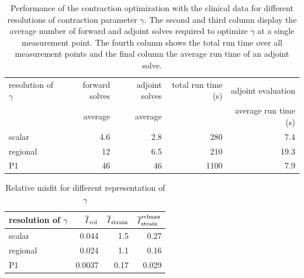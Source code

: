 \begin{table}
  \centering
\caption{Performance of the contraction optimization with the clinical data for different
resolutions of contraction parameter $\gamma$.
The second and third column display the average number of forward and adjoint solves required to
optimize $\gamma$ at a single measurement point. The fourth column shows the total run time over all measurement points and
the final column the average run time of an adjoint solve. }
\begin{tabular}{lrrrr}
\hline
 resolution of $\gamma$ & forward solves &    adjoint solves &   total run time (s)  & adjoint evaluation \\
                       &  average        & average           &                       & average run time (s) \\
\hline
 scalar                &                   4.6  &                   2.8 &    280   & 7.4 \\ %
 regional              &                   12   &                   6.5 &    210   & 19.3 \\ %
 P1                    &                   46   &                   46  &    1100  & 7.9 \\ %
\hline
\end{tabular}
\label{tab:patient_opt_details}
\end{table}



\begin{table}
\caption{Relative misfit for different representation of $\gamma$}
\begin{tabular}{lrrr}
\hline
 resolution of $\gamma$ &   $\overline{I}_{\text{vol}}$ &   $\overline{I}_{\text{strain}}$  &    $\overline{I}^{\text{relmax}}_{\text{strain}}$ \\
\hline
 scalar           &                          0.044  &                                              1.5  &                                             0.27  \\
 regional         &                          0.024  &                                              1.1  &                                             0.16  \\
 P1               &                          0.0037 &                                              0.17 &                                             0.029 \\
\hline
\end{tabular}
\label{tab:gamma_space_opt_misfit}
\end{table}




